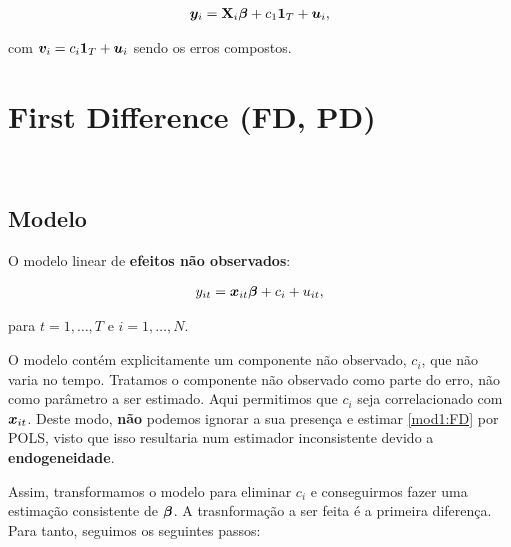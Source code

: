 \documentclass[11pt, oneside, a4paper, article]{article}
\numberwithin{equation}{section}
\begin{document}
\vspace{-1 em}
\begin{align*} %
	\yvec_{i} = \Xmat_{i} \betavec + c_{1} \onevec_{T} + \uvec_{i},
\end{align*}

\noindent
com
$\boldsymbol{v}_{i} = c_{i} \boldsymbol{1}_{T} + \boldsymbol{u}_{i}$ sendo os erros compostos.

\clearpage
\section{First Difference (FD, PD)}
\noindent
\citet[Sec.10.6 -- First Difference Methods, p.279]{wool-2010} \\

\subsection{Modelo}

O modelo linear de \textbf{efeitos não observados}:

\vspace{-1 em}
\begin{align} \label{mod1:FD}
	y_{it} = \boldsymbol{x}_{it} \boldsymbol{\beta} + c_{i} + u_{it},
\end{align}

\noindent
para
$t = 1, \dots, T$ e $i = 1, \dots, N$.

O modelo contém explicitamente um componente não observado, $c_{i}$, que não varia no tempo.
Tratamos o componente não observado como parte do erro, não como parâmetro a ser estimado.
Aqui permitimos que $c_{i}$ seja correlacionado com $\boldsymbol{x}_{it}$.
Deste modo, \textbf{não} podemos ignorar a sua presença e estimar \eqref{mod1:FD} por POLS, visto que isso resultaria num estimador inconsistente devido a \textbf{endogeneidade}.

Assim, transformamos o modelo para eliminar $c_{i}$ e conseguirmos fazer uma estimação consistente de $\boldsymbol{\beta}$.
A trasnformação a ser feita é a primeira diferença.
Para tanto, seguimos os seguintes passos:
\end{document}
